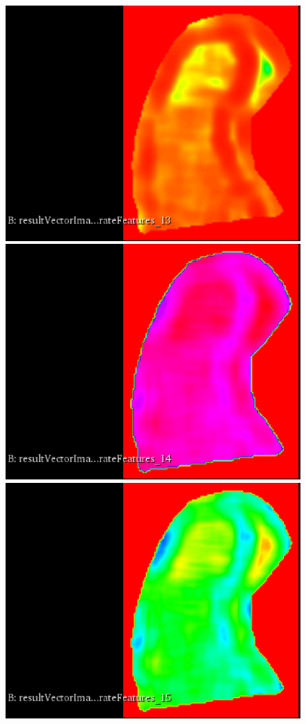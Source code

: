 \documentclass{InsightArticle}
\begin{document}
\begin{figure}[H]
  \begin{center}
    \includegraphics[scale=0.25]{figures/Correlation.eps}
    \includegraphics[scale=0.25]{figures/InverseDifferenceMoment.eps}
    \includegraphics[scale=0.25]{figures/Inertia.eps}

\end{center}
\end{figure}
\end{document}
